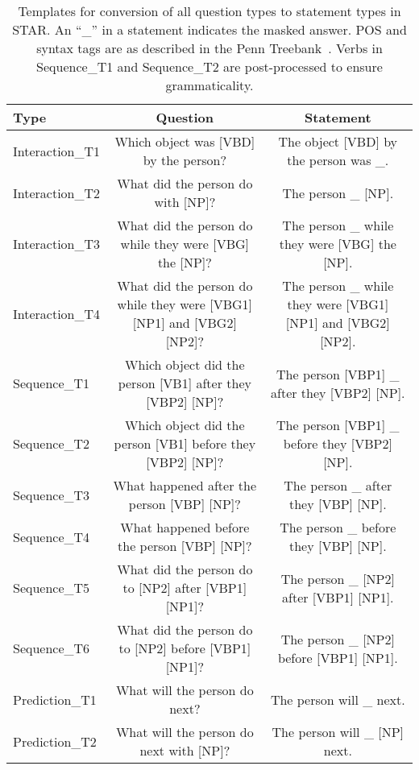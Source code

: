 \begin{landscape}
\begin{table}[t]
    \centering
    \caption{Templates for conversion of all question types to statement types
        in STAR. An ``\_'' in a statement indicates the masked answer.  POS and
        syntax tags are as described in the Penn
        Treebank~\citep{marcus1993penntreebank}. Verbs in Sequence\_T1 and
        Sequence\_T2 are post-processed to ensure grammaticality.}
    \label{tab:qs_to_stmts}
    \scriptsize
    \begin{tabular}{lcc}
        \toprule
        Type & Question & Statement \\
        \midrule
        Interaction\_T1 & Which object was [VBD] by the person? & The object [VBD] by the person was \_. \\
        Interaction\_T2 & What did the person do with [NP]? & The person \_ [NP]. \\
        Interaction\_T3 & What did the person do while they were [VBG] the [NP]? & The person \_ while they were [VBG] the [NP]. \\
        Interaction\_T4 & What did the person do while they were [VBG1] [NP1] and [VBG2] [NP2]? & The person \_ while they were [VBG1] [NP1] and [VBG2] [NP2]. \\
        \midrule
        Sequence\_T1 & Which object did the person [VB1] after they [VBP2] [NP]? & The person [VBP1] \_ after they [VBP2] [NP]. \\
        Sequence\_T2 & Which object did the person [VB1] before they [VBP2] [NP]? & The person [VBP1] \_ before they [VBP2] [NP]. \\
        Sequence\_T3 & What happened after the person [VBP] [NP]? & The person \_ after they [VBP] [NP]. \\
        Sequence\_T4 & What happened before the person [VBP] [NP]? & The person \_ before they [VBP] [NP]. \\
        Sequence\_T5 & What did the person do to [NP2] after [VBP1] [NP1]? & The person \_ [NP2] after [VBP1] [NP1]. \\
        Sequence\_T6 & What did the person do to [NP2] before [VBP1] [NP1]? & The person \_ [NP2] before [VBP1] [NP1]. \\
        \midrule
        Prediction\_T1 & What will the person do next? & The person will \_ next. \\
        Prediction\_T2 & What will the person do next with [NP]? & The person will \_ [NP] next. \\

\end{tabular}
\end{table}
\end{landscape}
